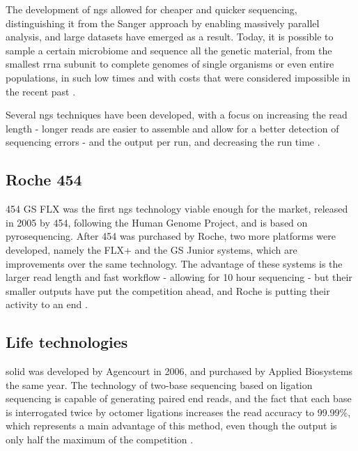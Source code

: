 \documentclass[
  oneside,
  11pt, a4paper,
  footinclude=true,
  headinclude=true,
  cleardoublepage=empty
]{scrbook}
\begin{document}
	The development of \gls{ngs} allowed for cheaper and quicker sequencing, distinguishing it from the Sanger approach by enabling massively parallel analysis, and large datasets have emerged as a result. Today, it is possible to sample a certain microbiome and sequence all the genetic material, from the smallest \gls{rrna} subunit to complete genomes of single organisms or even entire populations, in such low times and with costs that were considered impossible in the recent past \citep{Liu2012, Buermans2014, Bahassi2014, VanDijk2014}.

    Several \gls{ngs} techniques have been developed, with a focus on increasing the read length - longer reads are easier to assemble and allow for a better detection of sequencing errors - and the output per run, and decreasing the run time \citep{Quail2012}.
    
    \subsection{Roche 454}

    454 GS FLX was the first \gls{ngs} technology viable enough for the market, released in 2005 by 454, following the Human Genome Project, and is based on pyrosequencing. After 454 was purchased by Roche, two more platforms were developed, namely the FLX+ and the GS Junior systems, which are improvements over the same technology. The advantage of these systems is the larger read length and fast workflow - allowing for 10 hour sequencing - but their smaller outputs have put the competition ahead, and Roche is putting their activity to an end \citep{Liu2012, Buermans2014}.
    
    \subsection{Life technologies}
    
    \gls{solid} was developed by Agencourt in 2006, and purchased by Applied Biosystems the same year. The technology of two-base sequencing based on ligation sequencing is capable of generating paired end reads, and the fact that each base is interrogated twice by octomer ligations increases the read accuracy to 99.99\%, which represents a main advantage of this method, even though the output is only half the maximum of the competition \citep{Liu2012, Buermans2014}.
    
\end{document}
